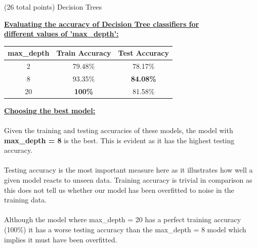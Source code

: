 \documentclass[12pt]{article}
\begin{document}
\begin{question}{(26 total points) Decision Trees}
\begin{subquestion}
\begin{answerbox}{39em}
\large{\textbf{\underline{Evaluating the accuracy of Decision Tree classifiers for}}}\\
\large{\textbf{\underline{different values of 'max\_depth':}}}\\
\normalsize{
\begin{center}
\begin{tabular}{ |c|c|c| }
\hline
\textbf{max\_depth} & \textbf{Train Accuracy} & \textbf{Test Accuracy} \\ \hline
2 & 79.48\% & 78.17\% \\
8 & 93.35\% & \textbf{\textcolor{OliveGreen}{84.08\%}} \\
20 & \textbf{\textcolor{OliveGreen}{100\%}} & 81.58\% \\
\hline
\end{tabular}
\end{center}
}
\normalsize{\textbf{\underline{Choosing the best model:}}\\
\\
Given the training and testing accuracies of these models, the model with \textbf{max\_depth = 8} is the best. This is evident as it has the highest testing accuracy.\\
\\
Testing accuracy is the most important measure here as it illustrates how well a given model reacts to unseen data. Training accuracy is trivial in comparison as this does not tell us whether our model has been overfitted to noise in the training data.\\
\\
Although the model where max\_depth = 20 has a perfect training accuracy (100\%) it has a worse testing accuracy than the max\_depth = 8 model which implies it must have been overfitted.
}
\end{answerbox}




\end{subquestion}
\end{question}
\end{document}
